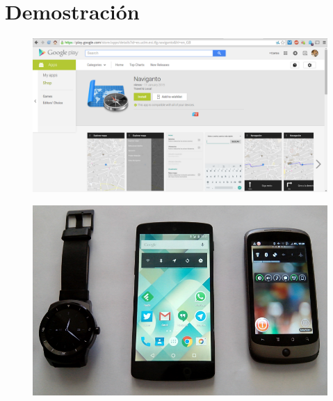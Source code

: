 \section{Demostración}

\begin{slide}
  \begin{figure}[!h]
    \begin{center}
      \includegraphics[height=0.8\textheight]{img/googleplay.png}
    \end{center}
  \end{figure}
\end{slide}

\begin{slide}
  \begin{figure}[!h]
    \begin{center}
      \includegraphics[height=0.7\textheight]{img/hardware.png}
    \end{center}
  \end{figure}
\end{slide}


